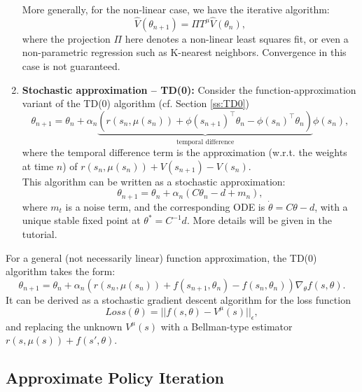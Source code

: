 \begin{enumerate}
More generally, for the non-linear case, we have the iterative algorithm:
$$\hat{V}(\theta_{n+1}) = \Pi T^\mu \hat{V}(\theta_{n}),$$
where the projection $\Pi$ here denotes a non-linear least squares fit, or even a non-parametric regression such as K-nearest neighbors. Convergence in this case is not guaranteed.

\item \textbf{Stochastic approximation -- TD(0):} Consider the function-approximation variant of the TD(0) algorithm (cf. Section \ref{ss:TD0})
\begin{equation*}
    \theta_{n+1} = \theta_n + \alpha_n \underbrace{( r(s_n,\mu(s_n)) + {\phi}(s_{n+1})^\top \theta_n - {\phi}(s_{n})^\top \theta_n)}_{\textrm{temporal difference}} \phi(s_{n}),
\end{equation*}
where the temporal difference term is the approximation (w.r.t. the weights at time $n$) of $r(s_n,\mu(s_n)) + V(s_{n+1}) - V(s_n)$.
\\
This algorithm can be written as a stochastic approximation:
\begin{equation*}
    \theta_{n+1} = \theta_n + \alpha_n ( C \theta_n - d + m_n ),
\end{equation*}
where $m_t$ is a noise term, and the corresponding ODE is $\dot{\theta} = C \theta - d$, with a unique stable fixed point at $\theta^* = C^{-1}d$. More details will be given in the tutorial.
\end{enumerate}

\begin{remark}
For a general (not necessarily linear) function approximation, the TD(0) algorithm takes the form:
\begin{equation*}
    \theta_{n+1} = \theta_n + \alpha_n \left( r(s_n,\mu(s_n)) + f(s_{n+1},\theta_n) - f(s_{n},\theta_n) \right) \nabla_{\theta} f(s,\theta).
\end{equation*}
It can be derived as a stochastic gradient descent algorithm for the loss function
\begin{equation*}
    Loss(\theta) = ||f(s,\theta) - V^\mu(s)||_\epsilon,
\end{equation*}
and replacing the unknown $V^\mu(s)$ with a Bellman-type estimator $r(s,\mu(s))+f(s',\theta)$.
\end{remark}
%

\subsection{Approximate Policy Iteration}

